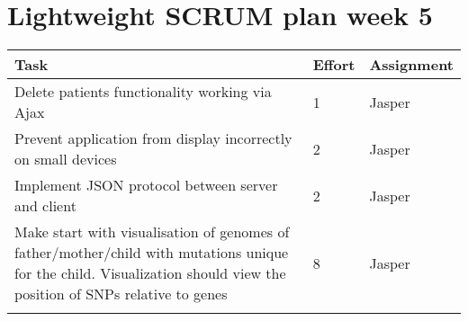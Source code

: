\documentclass[a4paper]{report}
\begin{document}


\section*{Lightweight SCRUM plan week 5}

\setlength\extrarowheight{5pt}
\begin{table}[ht]
\begin{tabular}{p{8cm}|p{2cm}|p{3cm}}

\textbf{Task} & \textbf{Effort} & \textbf{Assignment}\\
\hline \hline

Delete patients functionality working via Ajax & 1 & Jasper\\
Prevent application from display incorrectly on small devices & 2 & Jasper\\
Implement JSON protocol between server and client & 2 & Jasper\\
Make start with visualisation of genomes of father/mother/child with mutations unique for the child. Visualization should view the position of SNPs relative to genes & 8 & Jasper\\

\vspace{10pt} & \vspace{10pt} & \vspace{10pt}\\

\end{tabular}
\end{table}
\end{document}
